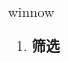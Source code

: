 
\begin{frame}
{\huge winnow}
\begin{center}
\begin{enumerate}\Large
  \item \textbf{筛选}
\end{enumerate}
\end{center}
\end{frame}
